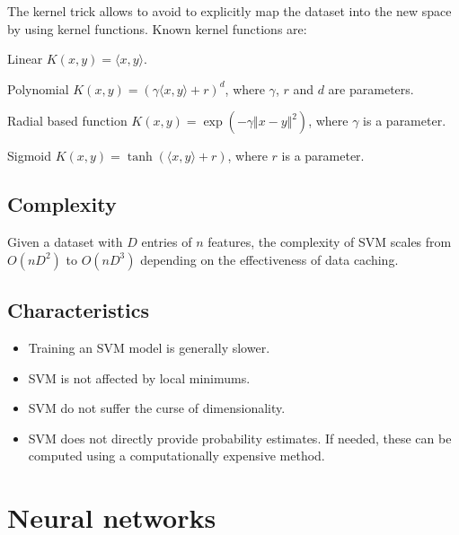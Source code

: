 The kernel trick allows to avoid to explicitly map the dataset into the new space by using kernel functions.
Known kernel functions are:
\begin{descriptionlist}
    \item[Linear] $K(x, y) = \langle x, y \rangle$.
    \item[Polynomial] $K(x, y) = (\gamma \langle x, y \rangle + r)^d$, where $\gamma$, $r$ and $d$ are parameters.
    \item[Radial based function] $K(x, y) = \exp(-\gamma \Vert x - y \Vert^2)$, where $\gamma$ is a parameter.
    \item[Sigmoid] $K(x, y) = \tanh(\langle x, y \rangle + r)$, where $r$ is a parameter.
\end{descriptionlist}


\subsection{Complexity}
Given a dataset with $D$ entries of $n$ features, the complexity of SVM scales from $O(nD^2)$ to $O(nD^3)$
depending on the effectiveness of data caching.


\subsection{Characteristics}
\begin{itemize}
    \item Training an SVM model is generally slower.
    \item SVM is not affected by local minimums.
    \item SVM do not suffer the curse of dimensionality.
    \item SVM does not directly provide probability estimates. 
        If needed, these can be computed using a computationally expensive method.
\end{itemize}



\section{Neural networks}

